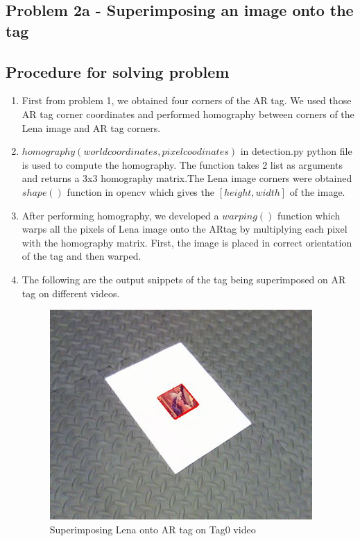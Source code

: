 \documentclass[12pt]{article}
\begin{document}
\subsection{Problem 2a - Superimposing an image onto the tag}
\subsection{Procedure for solving problem }
\begin{enumerate}
\item First from problem 1, we obtained four corners of the AR tag. We used those AR tag corner coordinates and performed homography between corners of the Lena image and AR tag corners.
\item $homography(worldcoordinates, pixelcoodinates)$ in detection.py python file is used to compute the homography. The function takes 2 list as arguments and returns a 3x3 homography matrix.The Lena image corners were obtained $shape()$ function in opencv which gives the $[height, width]$ of the image.


\item After performing homography, we developed a $warping()$ function which warps all the pixels of Lena image onto the ARtag by multiplying each pixel with the homography matrix. First, the image is placed in correct orientation of the tag and then warped.

\item The following are the output snippets of the tag being superimposed on AR tag on different videos.
\begin{figure}[h]
    \centering
    \includegraphics[width=10cm]{Tag0_videooutput}
    \caption{Superimposing Lena onto AR tag on Tag0 video}
    \label{fig:video frame output}
\end{figure}


\end{enumerate}
\end{document}
